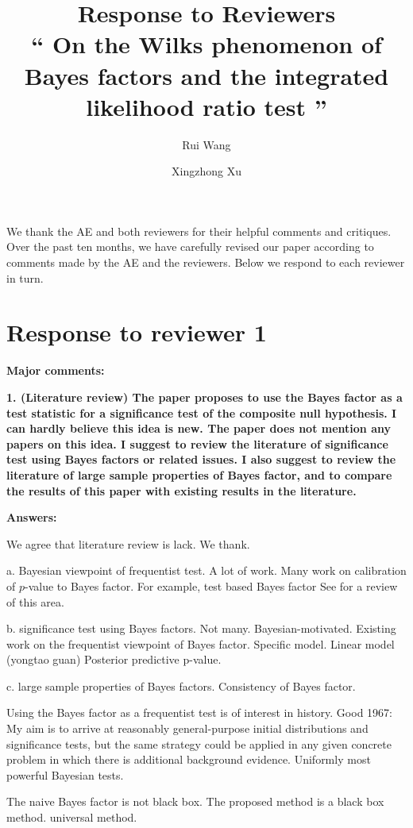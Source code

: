 \documentclass[11pt]{article}
\title{Response to Reviewers\\
    ``
    On the Wilks phenomenon of Bayes factors and the integrated likelihood ratio test
    ''
}
\author[1]{Rui Wang}
\author[1,2]{Xingzhong Xu}
\affil[1]{
School of Mathematics and Statistics, Beijing Institute of Technology, Beijing 
    100081,China
}
\affil[2]{
Beijing Key Laboratory on MCAACI, Beijing Institute of Technology, Beijing 100081,China
}
\theoremstyle{plain}
\theoremstyle{definition}
\theoremstyle{remark}
\begin{document}
\maketitle

We thank the AE and both reviewers for their helpful comments and critiques.
Over the past ten months, we have carefully revised our paper according to comments made by the AE and the reviewers.
Below we respond to each reviewer in turn.

\section{Response to reviewer 1}


\textbf{Major comments:}

\textbf{1.
    (Literature review) The paper proposes to use the Bayes factor as a test statistic for a significance test of the composite null hypothesis. I can hardly believe this idea is new. The paper does not mention any papers on this idea. I suggest to review the literature of significance test using Bayes factors or related issues. I also suggest to review the literature of large sample properties of Bayes factor, and to compare the results of this paper with existing results in the literature.
}

\textbf{Answers:}

We agree that literature review is lack.
We thank.

a. Bayesian viewpoint of frequentist test. A lot of work.
Many work on calibration of $p$-value to Bayes factor.
For example, test based Bayes factor
See \cite{Held2018} for a review of this area.

b. significance test using Bayes factors. Not many. Bayesian-motivated.
Existing work on the frequentist viewpoint of Bayes factor.
Specific model. Linear model (yongtao guan)
Posterior predictive p-value.

c. large sample properties of Bayes factors.
Consistency of Bayes factor.

Using the Bayes factor as a frequentist test is of interest in history.
Good 1967: My aim is to arrive at reasonably general-purpose initial distributions and significance tests, but the same strategy could be applied in any given concrete problem in which there is additional background evidence.
Uniformly most powerful Bayesian tests.

The naive Bayes factor is not black box.
The proposed method is a black box method. universal method.
\end{document}
